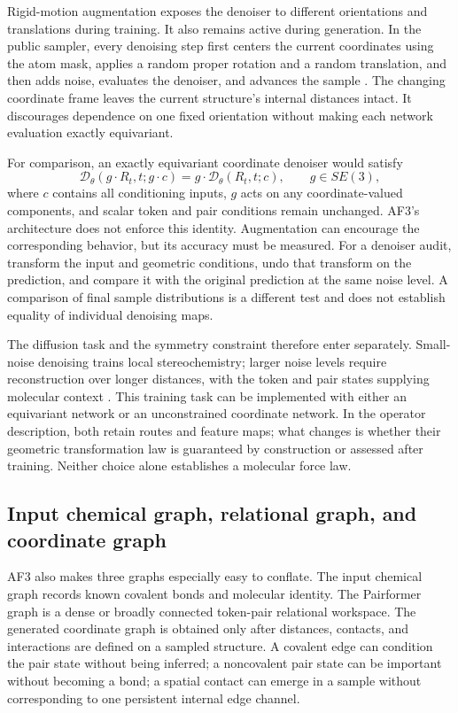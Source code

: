 Rigid-motion augmentation exposes the denoiser to different orientations and translations during
training.  It also remains active during generation.  In the public sampler, every denoising step
first centers the current coordinates using the atom mask, applies a random proper rotation and
a random translation, and then adds noise, evaluates the denoiser, and advances the sample
\cite{alphafold3diffusioncode}.  The changing coordinate frame leaves the current structure's
internal distances intact.  It discourages dependence on one fixed orientation without making
each network evaluation exactly equivariant.

For comparison, an exactly equivariant coordinate denoiser would satisfy
\begin{equation}
\mathcal D_\theta(g\!\cdot\!R_t,t;g\!\cdot\!c)
=g\!\cdot\!\mathcal D_\theta(R_t,t;c),
\qquad g\in SE(3),
\label{eq:book-af3-denoiser-equivariance}
\end{equation}
where $c$ contains all conditioning inputs, $g$ acts on any coordinate-valued components, and
scalar token and pair conditions remain unchanged.  AF3's architecture does not enforce this
identity.  Augmentation can encourage the corresponding behavior, but its accuracy must be
measured.  For a denoiser audit, transform the input and geometric conditions, undo that transform
on the prediction, and compare it with the original prediction at the same noise level.  A
comparison of final sample distributions is a different test and does not establish equality of
individual denoising maps.

The diffusion task and the symmetry constraint therefore enter separately.  Small-noise
denoising trains local stereochemistry; larger noise levels require reconstruction over longer
distances, with the token and pair states supplying molecular context \cite{abramson2024}.
This training task can be implemented with either an equivariant network or an unconstrained
coordinate network.  In the operator description, both retain routes and feature maps; what
changes is whether their geometric transformation law is guaranteed by construction or assessed
after training.  Neither choice alone establishes a molecular force law.

\subsection{Input chemical graph, relational graph, and coordinate graph}

AF3 also makes three graphs especially easy to conflate.  The input chemical graph records known
covalent bonds and molecular identity.  The Pairformer graph is a dense or broadly connected
token-pair relational workspace.  The generated coordinate graph is obtained only after distances,
contacts, and interactions are defined on a sampled structure.  A covalent edge can condition the
pair state without being inferred; a noncovalent pair state can be important without becoming a
bond; a spatial contact can emerge in a sample without corresponding to one persistent internal
edge channel.

